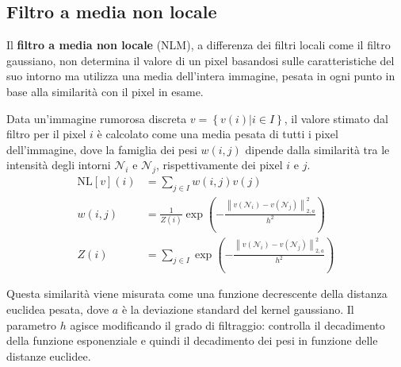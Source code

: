 \documentclass[../main.tex]{subfiles}
\begin{document}
\subsection{Filtro a media non locale}

Il \textbf{filtro a media non locale} (NLM), a differenza dei filtri locali come il filtro gaussiano, non determina il valore di un pixel basandosi sulle caratteristiche del suo intorno ma utilizza una media dell'intera immagine, pesata in ogni punto in base alla similarità con il pixel in esame.\cite{buades_2011}

Data un'immagine rumorosa discreta $v = \left\{v(i) | i\in I\right\}$, il valore stimato dal filtro per il pixel $i$ è calcolato come una media pesata di tutti i pixel dell'immagine, dove la famiglia dei pesi $w(i,j)$ dipende dalla similarità tra le intensità degli intorni $\mathcal{N}_i$ e $\mathcal{N}_j$, rispettivamente dei pixel $i$ e $j$.
\begin{align}
	\text{NL}[v](i) &= \sum_{j\in I}w(i,j)v(j)\\
	w(i,j) &= \frac{1}{Z(i)}\exp\left(-\frac{\left\lVert v(\mathcal{N}_i) - v(\mathcal{N}_j) \right\lVert^2_{2,a}}{h^2}\right)\\
	Z(i) &= \sum_{j\in I}\exp\left(-\frac{\left\lVert v(\mathcal{N}_i) - v(\mathcal{N}_j) \right\lVert^2_{2,a}}{h^2}\right)
\end{align}

Questa similarità viene misurata come una funzione decrescente della distanza euclidea pesata, dove $a$ è la deviazione standard del kernel gaussiano. Il parametro $h$ agisce modificando il grado di filtraggio: controlla il decadimento della funzione esponenziale e quindi il decadimento dei pesi in funzione delle distanze euclidee.\cite{buades_2005}\\
\end{document}
